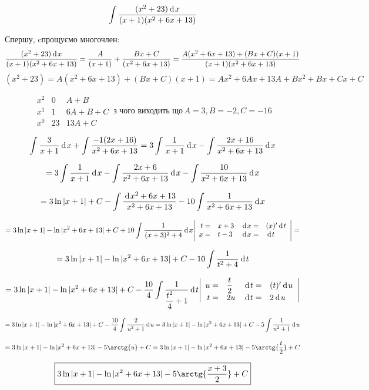 {}

$$
  \int \dfrac{(x^2+23)\hspace{2pt}\text{d}\hspace{1pt}{x}}{(x+1)(x^2+6x+13)}
$$

Спершу, cпрощуємо многочлен:
$$
  \dfrac{(x^2+23)\hspace{2pt}\text{d}\hspace{1pt}{x}}{(x+1)(x^2+6x+13)}
= \dfrac{A}{(x+1)} + \dfrac{Bx+C}{(x^2+6x+13)}
= \dfrac{A(x^2+6x+13) + (Bx+C)(x+1)}{(x+1)(x^2+6x+13)}
$$
$$
  (x^2+23) = A(x^2+6x+13) + (Bx+C)(x+1) = Ax^2+6Ax+13A+Bx^2+Bx+Cx+C
$$

$$
  \begin{array}{rcl}
    x^2 & 0  & A+B\\
    x^1 & 1  & 6A+B+C\\
    x^0 & 23 & 13A+C
    \end{array}
    \hspace{2pt}
    {\text{з чого виходить що}}
    \hspace{2pt}
    A=3, B=-2, C=-16
$$

$$
  \int \dfrac{3}{x+1}\hspace{2pt}\text{d}\hspace{1pt}{x} + \int \dfrac{-1(2x+16)}{x^2+6x+13}
= 3\int \dfrac{1}{x+1}\hspace{2pt}\text{d}\hspace{1pt}{x} - \int \dfrac{2x+16}{x^2+6x+13}\hspace{2pt}\text{d}\hspace{1pt}{x}
$$

$$
= 3\int \dfrac{1}{x+1}\hspace{2pt}\text{d}\hspace{1pt}{x} - \int \dfrac{2x+6}{x^2+6x+13}\hspace{2pt}\text{d}\hspace{1pt}{x} - \int \dfrac{10}{x^2+6x+13}\hspace{2pt}\text{d}\hspace{1pt}{x}
$$

$$
= 3 \ln{|x+1|} + C - \int \dfrac{\hspace{2pt}\text{d}\hspace{1pt}{x^2+6x+13}}{x^2+6x+13} - 10\int \dfrac{1}{x^2+6x+13}\hspace{2pt}\text{d}\hspace{1pt}{x}
$$

$$
= 3 \ln{|x+1|} - \ln{|x^2+6x+13|} + C + 10\int \dfrac{1}{(x+3)^2+4}\hspace{2pt}\text{d}\hspace{1pt}{x}
\Bigg|
  \begin{array}{rlrl}
    t = & x+3   & \hspace{2pt}\text{d}\hspace{1pt}{x} = & (x)'\hspace{2pt}\text{d}\hspace{1pt}{t}\\
    x = & t - 3 & \hspace{2pt}\text{d}\hspace{1pt}{x} = & \hspace{2pt}\text{d}\hspace{1pt}{t} \\
    \end{array}
\Bigg| =
$$

$$
  = 3 \ln{|x+1|} - \ln{|x^2+6x+13|} + C - 10\int \dfrac{1}{t^2+4}\hspace{2pt}\text{d}\hspace{1pt}{t}
$$

$$
= 3 \ln{|x+1|} - \ln{|x^2+6x+13|} + C - \dfrac{10}{4}\int \dfrac{1}{\dfrac{t^2}{4}+1}\hspace{2pt}\text{d}\hspace{1pt}{t}
\Bigg|
  \begin{array}{rlrl}
    u = & \dfrac{t}{2}   & \hspace{2pt}\text{d}\hspace{1pt}{t} = & (t)'\hspace{2pt}\text{d}\hspace{1pt}{u}\\
    t = & 2u & \hspace{2pt}\text{d}\hspace{1pt}{t} = & 2\hspace{2pt}\text{d}\hspace{1pt}{u} \\
    \end{array}
\Bigg|
$$

$$
= 3 \ln{|x+1|} - \ln{|x^2+6x+13|} + C - \dfrac{10}{4}\int \dfrac{2}{u^2+1}\hspace{2pt}\text{d}\hspace{1pt}{u} = 3 \ln{|x+1|} - \ln{|x^2+6x+13|} + C - 5\int \dfrac{1}{u^2+1}\hspace{2pt}\text{d}\hspace{1pt}{u}
$$

$$
= 3 \ln{|x+1|} - \ln{|x^2+6x+13|} - 5 \arctg{u} + C
= 3 \ln{|x+1|} - \ln{|x^2+6x+13|} - 5 \arctg{\dfrac{t}{2}} + C
$$

$$
\boxed{ 3 \ln{|x+1|} - \ln{|x^2+6x+13|} - 5 \arctg{\dfrac{x+3}{2}} + C }
$$
